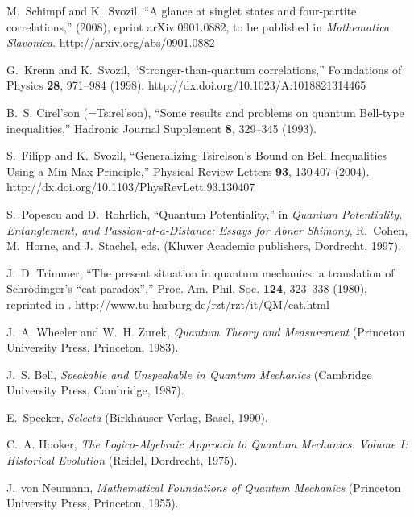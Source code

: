 \documentclass[pra,amsfonts,showpacs,showkeys,preprint]{revtex4}
\begin{document}
\begin{thebibliography}{10}
M.~Schimpf and K.~Svozil, \enquote{A glance at singlet states and four-partite
  correlations,}  (2008), eprint arXiv:0901.0882, to be published in {\it
  {M}athematica {S}lavonica}.
\newline http://arxiv.org/abs/0901.0882

G.~Krenn and K.~Svozil, \enquote{Stronger-than-quantum correlations,}
  Foundations of Physics {\bf 28}, 971--984 (1998).
\newline http://dx.doi.org/10.1023/A:1018821314465

B.~S. {Cirel'son (=Tsirel'son)}, \enquote{Some results and problems on quantum
  {B}ell-type inequalities,} Hadronic Journal Supplement {\bf 8}, 329--345
  (1993).

S.~Filipp and K.~Svozil, \enquote{Generalizing {T}sirelson's Bound on Bell
  Inequalities Using a Min-Max Principle,} Physical Review Letters {\bf 93},
  130\,407 (2004).
\newline http://dx.doi.org/10.1103/PhysRevLett.93.130407

S.~Popescu and D.~Rohrlich, \enquote{Quantum Potentiality,} in {\em Quantum
  Potentiality, Entanglement, and Passion-at-a-Distance: Essays for Abner
  Shimony\/}, R.~Cohen, M.~Horne, and J.~Stachel, eds.  (Kluwer Academic
  publishers, Dordrecht, 1997).

J.~D. Trimmer, \enquote{The present situation in quantum mechanics: a
  translation of {S}chr{\"{o}}dinger's ``cat paradox'',} Proc. Am. Phil. Soc.
  {\bf 124}, 323--338 (1980), reprinted in \cite[pp.
  152-167]{wheeler-Zurek:83}.
\newline http://www.tu-harburg.de/rzt/rzt/it/QM/cat.html

J.~A. Wheeler and W.~H. Zurek, {\em Quantum Theory and Measurement\/}
  (Princeton University Press, Princeton, 1983).

J.~S. Bell, {\em Speakable and Unspeakable in Quantum Mechanics\/} (Cambridge
  University Press, Cambridge, 1987).

E.~Specker, {\em Selecta\/} (Birkh{\"{a}}user Verlag, Basel, 1990).

C.~A. Hooker, {\em The Logico-Algebraic Approach to Quantum Mechanics. {V}olume
  {I}: Historical Evolution\/} (Reidel, Dordrecht, 1975).

J.~von Neumann, {\em Mathematical Foundations of Quantum Mechanics\/}
  (Princeton University Press, Princeton, 1955).

\end{thebibliography}
\end{document}

